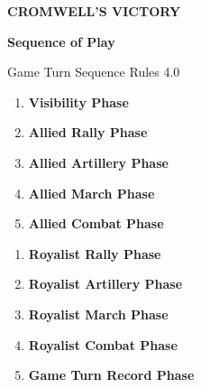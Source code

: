\thispagestyle{fancy}

{\sffamily\bfseries\fontsize{27}{29}\selectfont\color{cvblue}
  CROMWELL'S VICTORY}\par
{\sffamily\bfseries\Large\color{cvred}Sequence of Play}\par
\vspace{2pt}{\color{cvred}\rule{\textwidth}{1pt}}

\begin{aidbox}{Game Turn Sequence \hfill \normalfont\small Rules 4.0}
\begin{minipage}[t]{.485\textwidth}
\begin{enumerate}[label=\textbf{\arabic*.},leftmargin=1.4em,itemsep=.16em]
  \item \textbf{Visibility Phase} \hfill {}
  \item \textbf{Allied Rally Phase} \hfill {}
  \item \textbf{Allied Artillery Phase} \hfill {}
  \item \textbf{Allied March Phase} \hfill {}
  \item \textbf{Allied Combat Phase} \hfill {}
\end{enumerate}
\end{minipage}\hfill
\begin{minipage}[t]{.485\textwidth}
\begin{enumerate}[label=\textbf{\arabic*.},leftmargin=1.55em,itemsep=.16em,start=6]
  \item \textbf{Royalist Rally Phase} \hfill {}
  \item \textbf{Royalist Artillery Phase} \hfill {}
  \item \textbf{Royalist March Phase} \hfill {}
  \item \textbf{Royalist Combat Phase} \hfill {}
  \item \textbf{Game Turn Record Phase} \hfill {}
\end{enumerate}
\end{minipage}
\end{aidbox}

